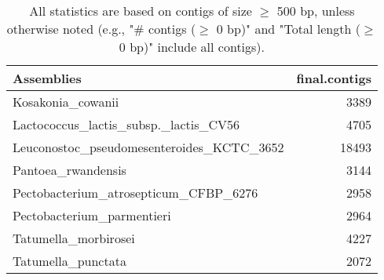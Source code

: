\documentclass[12pt,a4paper]{article}
\begin{document}
\begin{table}[ht]
\begin{center}
\caption{All statistics are based on contigs of size $\geq$ 500 bp, unless otherwise noted (e.g., "\# contigs ($\geq$ 0 bp)" and "Total length ($\geq$ 0 bp)" include all contigs).}
\begin{tabular}{|l*{1}{|r}|}
\hline
Assemblies & final.contigs \\ \hline
Kosakonia\_cowanii & 3389 \\ \hline
Lactococcus\_lactis\_subsp.\_lactis\_CV56 & 4705 \\ \hline
Leuconostoc\_pseudomesenteroides\_KCTC\_3652 & 18493 \\ \hline
Pantoea\_rwandensis & 3144 \\ \hline
Pectobacterium\_atrosepticum\_CFBP\_6276 & 2958 \\ \hline
Pectobacterium\_parmentieri & 2964 \\ \hline
Tatumella\_morbirosei & 4227 \\ \hline
Tatumella\_punctata & 2072 \\ \hline
\end{tabular}
\end{center}
\end{table}
\end{document}
